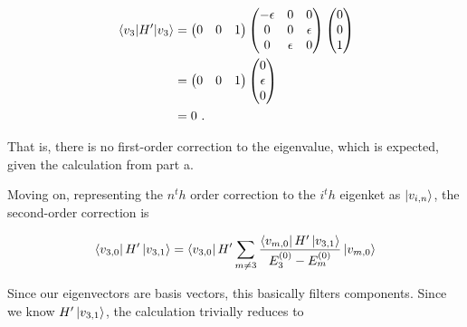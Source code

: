 \begin{alphaparts}
\begin{align}
    \expectationvalue{H'}{v_3} &= \begin{pmatrix}
        0 & 0 & 1
    \end{pmatrix}\begin{pmatrix}
        -\epsilon       & 0         & 0         \\
        0               & 0         & \epsilon  \\
        0               & \epsilon  & 0           
    \end{pmatrix}\begin{pmatrix}
        0 \\ 0 \\ 1
    \end{pmatrix}\nonumber\\
    &= \begin{pmatrix}
        0 & 0 & 1
    \end{pmatrix}\begin{pmatrix}
        0 \\ \epsilon \\ 0
    \end{pmatrix}\nonumber\\
    &= 0~.
\end{align}

That is, there is no first-order correction to the eigenvalue, which is
expected, given the calculation from part a.

Moving on, representing the $n^th$ order correction to the $i^th$ eigenket as
$\ket{v_{i, n}}$, the second-order correction is

\begin{align}
    \bra{v_{3, 0}} H' \ket{v_{3, 1}} = \bra{v_{3, 0}} H' \sum_{m\not = 3} \frac{\bra{v_{m, 0}} H' \ket*{v_{3, 1}}}{E_3^{(0)}-E_m^{(0)}} \ket{v_{m, 0}}
\end{align}

Since our eigenvectors are basis vectors, this basically filters components.
Since we know $H'\ket{v_{3, 1}}$, the calculation trivially reduces to


\end{alphaparts}
